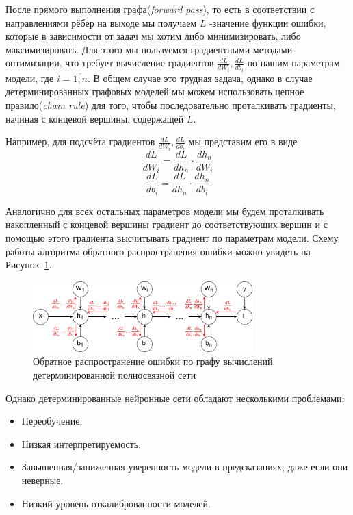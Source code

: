 \documentclass[14pt]{article}
\begin{document}
После прямого выполнения графа(\textit{forward pass}), то есть в соответствии с направлениями рёбер на выходе мы получаем
 $L$ -значение функции ошибки, которые в зависимости от задач мы хотим либо минимизировать, либо максимизировать. Для этого
 мы пользуемся градиентными методами оптимизации, что требует вычисление градиентов $\frac{dL}{d W_i}, \frac{dL}{d b_i}$ по нашим параметрам модели, где $i = \overline{1,n}$.
 В общем случае это трудная задача, однако в случае детерминированных графовых моделей мы можем использовать цепное правило(\textit{chain rule}) для того, чтобы последовательно
 проталкивать градиенты, начиная с концевой вершины, содержащей $L$.

 Например, для подсчёта градиентов $\frac{dL}{d W_i}, \frac{dL}{d b_i}$ мы представим его в виде
 $$\frac{dL}{d W_i} = \frac{dL}{d h_n} \cdot \frac{d h_n}{d W_i}$$
 $$\frac{dL}{d b_i} = \frac{dL}{d h_n} \cdot \frac{d h_n}{d b_i}$$

Аналогично для всех остальных параметров модели мы будем проталкивать накопленный с концевой вершины градиент до соответствующих вершин и
 с помощью этого градиента высчитывать градиент по параметрам модели. Схему работы алгоритма обратного распространения ошибки
 можно увидеть на Рисунок~\ref{fig:image2}.
\begin{figure}[!htb]
    \centering
    \includegraphics[width=8.5cm]{ANN_back_prop.png}
    \caption{Обратное распространение ошибки по графу вычислений детерминированной полносвязной сети}
    \label{fig:image2}
\end{figure}

Однако детерминированные нейронные сети обладают несколькими проблемами:
\begin{itemize}
    \item Переобучение.
    \item Низкая интерпретируемость.
    \item Завышенная/заниженная уверенность модели в предсказаниях, даже если они неверные.
    \item Низкий уровень откалиброванности моделей.
\end{itemize}
\end{document}
